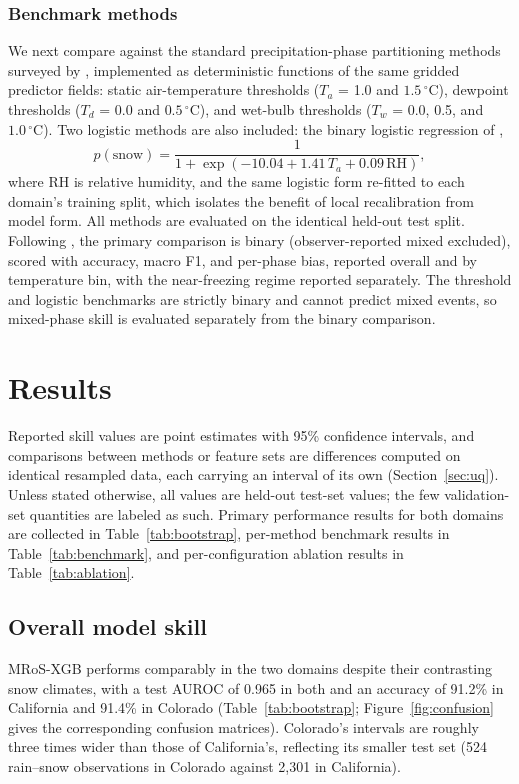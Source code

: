 \documentclass[twocol]{ametsocV6.1} %
\newcommand{\degC}[1]{\ensuremath{#1\,^{\circ}\mathrm{C}}}
\begin{document}
\subsubsection{Benchmark methods}
\label{sec:bench-methods}
We next compare against the standard precipitation-phase partitioning
methods surveyed by \citet{jennings2025}, implemented as deterministic
functions of the same gridded predictor fields: static air-temperature
thresholds ($T_a$ = 1.0 and \degC{1.5}), dewpoint thresholds ($T_d$ =
0.0 and \degC{0.5}), and wet-bulb thresholds ($T_w$ = 0.0, 0.5,
and \degC{1.0}). Two logistic methods are also included: the binary
logistic regression of \citet{jennings2018spatial},
\begin{equation}
  p(\mathrm{snow}) = \frac{1}{1 + \exp(-10.04 + 1.41\,T_a
  + 0.09\,\mathrm{RH})} ,
  \label{eq:logistic}
\end{equation}
where RH is relative humidity, and the same logistic form re-fitted to
each domain's training split,
which isolates the benefit of local recalibration from model form. All
methods are evaluated on the identical held-out test split. Following
\citet{jennings2025}, the primary comparison is binary
(observer-reported mixed excluded), scored with accuracy, macro F1, and
per-phase bias, reported overall and by temperature bin, with the
near-freezing regime reported separately. The threshold and logistic
benchmarks are strictly binary and cannot predict mixed events, so
mixed-phase skill is evaluated separately from the binary comparison.

\section{Results}
\label{sec:results}

Reported skill values are point estimates with 95\% confidence
intervals, and comparisons between methods or feature sets are
differences computed on identical resampled data, each carrying an
interval of its own (Section~\ref{sec:uq}). Unless stated otherwise, all
values are held-out test-set values; the few validation-set quantities
are labeled as such. Primary performance results for both domains are
collected in Table~\ref{tab:bootstrap}, per-method benchmark results in
Table~\ref{tab:benchmark}, and per-configuration ablation results in
Table~\ref{tab:ablation}.

\subsection{Overall model skill}
\label{sec:skill-results}
MRoS-XGB performs comparably in the two domains despite their
contrasting snow climates, with a test AUROC of 0.965 in both and an
accuracy of 91.2\% in California and 91.4\% in Colorado
(Table~\ref{tab:bootstrap}; Figure~\ref{fig:confusion} gives the
corresponding confusion matrices). Colorado's intervals are roughly three
times wider than those of California's, reflecting its smaller test set (524
rain--snow observations in Colorado against 2{,}301 in California).
\end{document}
